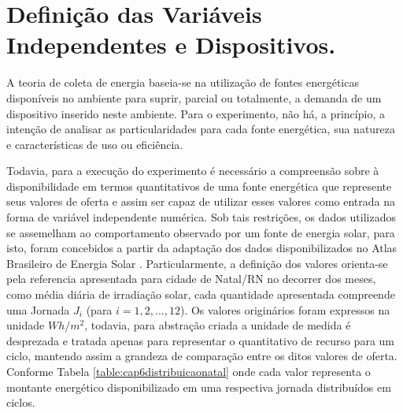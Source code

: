 \section{Definição das Variáveis Independentes e Dispositivos.}
\label{cap6:variaveisdispositivos}
A teoria de coleta de energia baseia-se na utilização de fontes energéticas disponíveis no ambiente para suprir, parcial ou totalmente, a demanda de um dispositivo inserido neste ambiente. Para o experimento, não há, a princípio, a intenção de analisar as particularidades para cada fonte energética, sua natureza e características de uso ou eficiência. 

Todavia, para a execução do experimento é necessário a compreensão sobre à disponibilidade em termos quantitativos de uma fonte energética que represente seus valores de oferta e assim ser capaz de utilizar esses valores como entrada na forma de variável independente numérica. Sob tais restrições, os dados utilizados se assemelham ao comportamento observado por um fonte de energia solar, para isto, foram concebidos a partir da adaptação dos dados disponibilizados no Atlas Brasileiro de Energia Solar \cite{martins2017atlas}. Particularmente, a definição dos valores orienta-se pela referencia apresentada para cidade de Natal/RN no decorrer dos meses, como média diária de irradiação solar, cada quantidade apresentada compreende uma Jornada $J_i$ (para $i = 1,2,...,12$). Os valores originários foram expressos na unidade  $Wh/m^2$, todavia, para abstração criada a unidade de medida é desprezada e tratada apenas para representar o quantitativo de recurso para um ciclo, mantendo assim a grandeza de comparação entre os ditos valores de oferta. Conforme Tabela \ref{table:cap6distribuicaonatal} onde cada valor representa o montante energético disponibilizado em uma respectiva jornada distribuídos em ciclos.

\begingroup

\setlength{\tabcolsep}{10pt} %
\renewcommand{\arraystretch}{1.5} %

